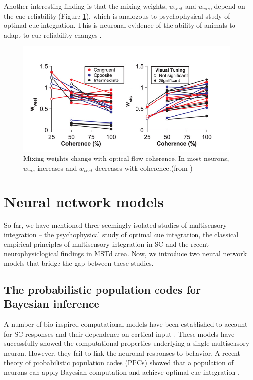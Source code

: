 \documentclass{article}[11pt]
\begin{document}
Another interesting finding is that the mixing weights, $w_{vest}$ and $w_{vis}$, depend on the cue reliability (Figure \ref{fig:weight}), which is analogous to psychophysical study of optimal cue integration.
This is neuronal evidence of the ability of animals to adapt to cue reliability changes .

\begin{figure}[tpb]
  \centering
  \includegraphics[width=.7\textwidth]{weight}
  \caption{Mixing weights change with optical flow coherence. In most neurons, $w_{vis}$ increases and $w_{vest}$ decreases with coherence.(from \cite{morgan_multisensory_2008})}
  \label{fig:weight}
\end{figure}


\section{Neural network models}
So far, we have mentioned three seemingly isolated studies of multisensory integration -- the psychophysical study of optimal cue integration, the classical empirical principles of multisensory integration in SC and the recent neurophysiological findings in MSTd area. Now, we introduce two neural network models that bridge the gap between these studies.

\subsection{The probabilistic population codes for Bayesian inference}
A number of bio-inspired computational models have been established to account for SC responses and their dependence on cortical input \cite{patton_modeling_2003, alvarado_neural_2008}. These models have successfully showed the computational properties underlying a single multisensory neuron. However, they fail to link the neuronal responses to behavior. A recent theory of probabilistic population codes (PPCs) showed that a population of neurons can apply Bayesian computation and achieve optimal cue integration \cite{ma_bayesian_2006}.
\end{document}
